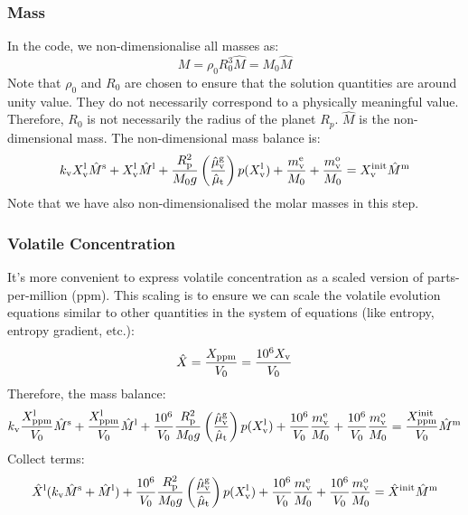 \subsubsection{Mass}
In the code, we non-dimensionalise all masses as:
\begin{equation}
M = \rho_0 R_0^3 \hat{M} = M_0 \hat{M}
\end{equation}
Note that $\rho_0$ and $R_0$ are chosen to ensure that the solution quantities are around unity value.  They do not necessarily correspond to a physically meaningful value.  Therefore, $R_0$ is not necessarily the radius of the planet $R_p$.  $\hat{M}$ is the non-dimensional mass.  The non-dimensional mass balance is:
\begin{equation}
k_{\rm v} X_{\rm v}^{\rm l} \hat{M}^{\rm s} + X_{\rm v}^{\rm l} \hat{M}^{\rm l} + \frac{R_{\rm p}^2}{M_0 g} \left( \frac{\hat{\mu}_{\rm v}^{\rm g}}{\hat{\mu}_{\rm t}} \right) p (X_{\rm v}^{\rm l}) + \frac{m_{\rm v}^{\rm e}}{M_0} + \frac{m_{\rm v}^{\rm o}}{M_0} = X_{\rm v}^{\rm init} \hat{M}^{\rm m}
\end{equation}
Note that we have also non-dimensionalised the molar masses in this step.
\subsubsection{Volatile Concentration}
It's more convenient to express volatile concentration as a scaled version of parts-per-million (ppm).  This scaling is to ensure we can scale the volatile evolution equations similar to other quantities in the system of equations (like entropy, entropy gradient, etc.):
\begin{equation}
\hat{X} = \frac{X_{\rm ppm}}{V_0} = \frac{10^6 X_{\rm v}}{V_0}
\end{equation}
Therefore, the mass balance:
\begin{equation}
k_{\rm v} \frac{X_{\rm ppm}^{\rm l}}{V_0} \hat{M}^{\rm s} + \frac{X_{\rm ppm}^{\rm l}}{V_0} \hat{M}^{\rm l} + \frac{10^6}{V_0} \frac{R_{\rm p}^2}{M_0 g} \left( \frac{\hat{\mu}_{\rm v}^{\rm g}}{\hat{\mu}_{\rm t}} \right) p (X_{\rm v}^{\rm l}) + \frac{10^6}{V_0} \frac{m_{\rm v}^{\rm e}}{M_0} + \frac{10^6}{V_0} \frac{m_{\rm v}^{\rm o}}{M_0} = \frac{X_{\rm ppm}^{\rm init}}{V_0} \hat{M}^{\rm m}
\end{equation}
Collect terms:
\begin{equation}
\hat{X}^{\rm l} (k_{\rm v} \hat{M}^{\rm s} + \hat{M}^{\rm l}) + \frac{10^6}{V_0}\frac{R_{\rm p}^2}{M_0 g} \left( \frac{\hat{\mu}_{\rm v}^{\rm g}}{\hat{\mu}_{\rm t}} \right) p (X_{\rm v}^{\rm l}) + \frac{10^6}{V_0} \frac{m_{\rm v}^{\rm e}}{M_0} + \frac{10^6}{V_0} \frac{m_{\rm v}^{\rm o}}{M_0} = \hat{X}^{\rm init} \hat{M}^{\rm m}
\end{equation}
